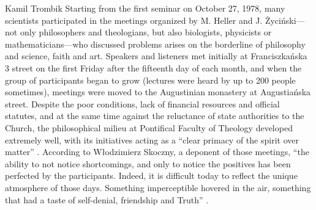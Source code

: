 \begin{artengenv}{Kamil Trombik}
Starting from the first seminar on October 27, 1978, many scientists participated in the meetings organized by M. Heller
and J. Życiński---not only philosophers and theologians, but also biologists, physicists or mathematicians---who discussed
problems arises on the borderline of philosophy and science, faith and art. Speakers and listeners met initially at
Franciszkańska 3 street on the first Friday after the fifteenth day of each month, and when the group of participants
began to grow (lectures were heard by up to 200 people sometimes), meetings were moved to the Augustinian monastery at
Augustiańska street. Despite the poor conditions, lack of financial resources and official statutes, and at the same
time against the reluctance of state authorities to the Church, the philosophical milieu at Pontifical Faculty of
Theology developed extremely well, with its initiatives acting as a ``clear primacy of the spirit over matter''
\parencite[p.13]{skoczny_spotkania_1999}.
According to Włodzimierz Skoczny, a deponent of those meetings, ``the
ability to not notice shortcomings, and only to notice the positives has been perfected by the participants. Indeed, it
is difficult today to reflect the unique atmosphere of those days. Something imperceptible hovered in the air,
something that had a taste of self-denial, friendship and Truth''
\parencites[p.15]{skoczny_spotkania_1999}[see also][]{zycinski_kartki_1999}.



\end{artengenv}
